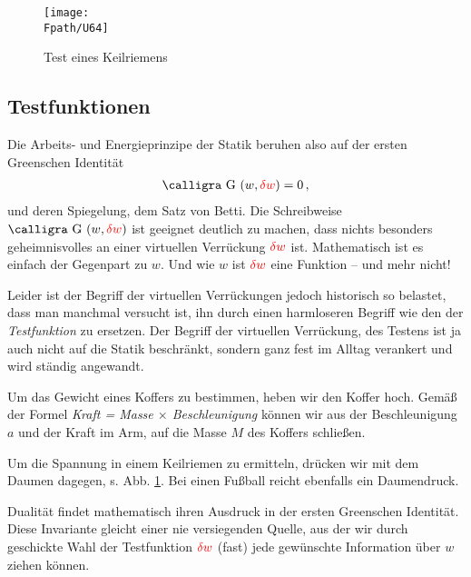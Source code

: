 {{{{%
\begin{figure}[tbp]
\centering
\if {} \sidecaption \fi
\texttt{[image: \\Fpath/U64]}
\caption{Test eines Keilriemens} \label{U64}
\end{figure}%

{\textcolor{sectionTitleBlue}{\section{Testfunktionen}}
Die Arbeits- und Energieprinzipe der Statik beruhen also auf der ersten Greenschen Identit\"{a}t
\begin{align}\label{Eq133}
\text{\normalfont\calligra G\,\,}(w,\textcolor{red}{\delta w}) = 0\,,
\end{align}
und deren \glq Spiegelung\grq{}, dem Satz von Betti. Die Schreibweise $\text{\normalfont\calligra G\,\,}(w,\textcolor{red}{\delta w})$ ist geeignet deutlich zu machen, dass nichts besonders geheimnisvolles an einer virtuellen Verr\"{u}ckung $\textcolor{red}{\delta w}$ ist. Mathematisch ist es einfach der Gegenpart zu $w$. Und wie $w$ ist $\textcolor{red}{\delta w}$ eine Funktion -- und mehr nicht!

Leider ist der Begriff der virtuellen Verr\"{u}ckungen jedoch historisch so belastet, dass man manchmal versucht ist, ihn durch einen harmloseren Begriff wie den der {\em Testfunktion\/} zu ersetzen. Der Begriff der virtuellen Verr\"{u}ckung, des Testens ist ja auch nicht auf die Statik beschr\"{a}nkt, sondern ganz fest im Alltag verankert und wird st\"{a}ndig angewandt.

Um das Gewicht eines Koffers zu bestimmen, heben wir den Koffer hoch. Gem\"{a}{\ss}
der Formel {\em Kraft = Masse $\times$ Beschleunigung\/} k\"{o}nnen wir aus der Beschleunigung $a$ und der Kraft im Arm, auf die Masse $M$ des Koffers schlie{\ss}en.

Um die Spannung in einem Keilriemen zu ermitteln, dr\"{u}cken wir mit dem Daumen dagegen, s. Abb. \ref{U64}. Bei einen Fu{\ss}ball reicht ebenfalls ein Daumendruck.

Dualit\"{a}t findet mathematisch ihren Ausdruck in der ersten Greenschen Identit\"{a}t. Diese Invariante gleicht einer nie versiegenden Quelle, aus der wir durch geschickte Wahl der Testfunktion $\textcolor{red}{\delta w} $ (fast) jede gew\"{u}nschte Information \"{u}ber $w$ ziehen k\"{o}nnen.

}}}}}
